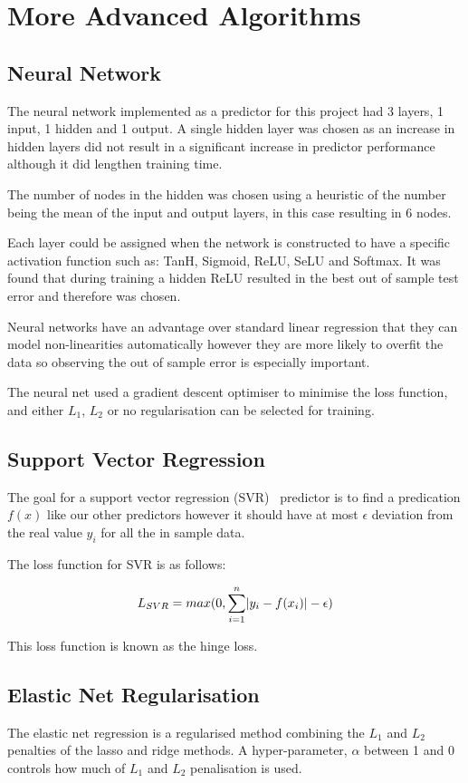 \documentclass[10pt,twocolumn,letterpaper]{article}
\DeclarePairedDelimiter\abs{\lvert}{\rvert}%
\begin{document}
\section{More Advanced Algorithms}

\subsection{Neural Network}
The neural network implemented as a predictor for this project had 3 layers, 1 input, 1 hidden and 1 output. A single hidden layer was chosen as an increase in hidden layers did not result in a significant increase in predictor performance although it did lengthen training time.

The number of nodes in the hidden was chosen using a heuristic of the number being the mean of the input and output layers, in this case resulting in 6 nodes.

Each layer could be assigned when the network is constructed to have a specific activation function such as: TanH, Sigmoid, ReLU, SeLU and Softmax. It was found that during training a hidden ReLU resulted in the best out of sample test error and therefore was chosen. 

Neural networks have an advantage over standard linear regression that they can model non-linearities automatically however they are more likely to overfit the data so observing the out of sample error is especially important.

The neural net used a gradient descent optimiser to minimise the loss function, and either $L_1$, $L_2$ or no regularisation can be selected for training. 

\subsection{Support Vector Regression}
The goal for a support vector regression (SVR)~\cite{Cortes1995} predictor is to find a predication $f(x)$ like our other predictors however it should have at most $\epsilon$ deviation from the real value $y_i$ for all the in sample data.

The loss function for SVR is as follows:

\begin{equation}
L_{SVR} = max(0, \sum_{i = 1}^{n} \abs{y_i - f(x_i)} - \epsilon)
\end{equation}

This loss function is known as the hinge loss.

\subsection{Elastic Net Regularisation}
The elastic net regression is a regularised method combining the $L_1$ and $L_2$ penalties of the lasso and ridge methods. A hyper-parameter, $\alpha$ between 1 and 0 controls how much of $L_1$ and $L_2$ penalisation is used.


{\small


}
\end{document}
